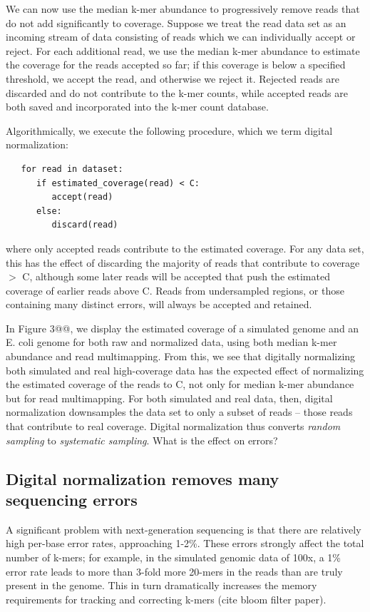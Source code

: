 \documentclass[10pt,draft]{article}
\begin{document}
We can now use the median k-mer abundance to progressively remove
reads that do not add significantly to coverage.  Suppose we treat the
read data set as an incoming stream of data consisting of reads which
we can individually accept or reject.  For each additional read, we
use the median k-mer abundance to estimate the coverage for the reads
accepted so far; if this coverage is below a specified threshold, we
accept the read, and otherwise we reject it.  Rejected reads are
discarded and do not contribute to the k-mer counts, while accepted
reads are both saved and incorporated into the k-mer count database.

Algorithmically, we execute the following procedure, which we term
digital normalization:

\begin{verbatim}
   for read in dataset:
      if estimated_coverage(read) < C:
         accept(read)
      else:
         discard(read)
\end{verbatim}

where only accepted reads contribute to the estimated coverage.  For any
data set, this has the effect of discarding the majority of reads that
contribute to coverage $>$ C, although some later reads will be accepted
that push the estimated coverage of earlier reads above C.  Reads from
undersampled regions, or those containing many distinct errors, will always
be accepted and retained.

In Figure 3@@, we display the estimated coverage of a simulated genome
and an E. coli genome for both raw and normalized data, using both
median k-mer abundance and read multimapping.  From this, we see that
digitally normalizing both simulated and real high-coverage data has
the expected effect of normalizing the estimated coverage of the reads
to C, not only for median k-mer abundance but for read multimapping.
For both simulated and real data, then, digital normalization
downsamples the data set to only a subset of reads -- those reads that
contribute to real coverage.  Digital normalization thus converts {\em
random sampling} to {\em systematic sampling}.  What is the effect on
errors?

\subsection*{Digital normalization removes many sequencing errors}

A significant problem with next-generation sequencing is that there
are relatively high per-base error rates, approaching 1-2\%.  These
errors strongly affect the total number of k-mers; for example, in the
simulated genomic data of 100x, a 1\% error rate leads to more than
3-fold more 20-mers in the reads than are truly present in the genome.
This in turn dramatically increases the memory requirements for
tracking and correcting k-mers (cite bloom filter paper).
\end{document}
